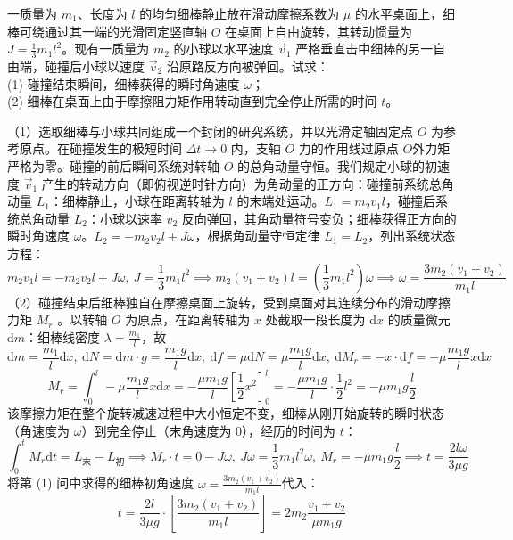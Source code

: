 \begin{example}
一质量为 $m_1$、长度为 $l$ 的均匀细棒静止放在滑动摩擦系数为 $\mu$ 的水平桌面上，细棒可绕通过其一端的光滑固定竖直轴 $O$ 在桌面上自由旋转，其转动惯量为 $J = \frac{1}{3}m_1 l^2$。现有一质量为 $m_2$ 的小球以水平速度 $\vec{v}_1$ 严格垂直击中细棒的另一自由端，碰撞后小球以速度 $\vec{v}_2$ 沿原路反方向被弹回。试求：\\
(1) 碰撞结束瞬间，细棒获得的瞬时角速度 $\omega$；\\
(2) 细棒在桌面上由于摩擦阻力矩作用转动直到完全停止所需的时间 $t$。
\end{example}
\begin{solution}
（1）选取细棒与小球共同组成一个封闭的研究系统，并以光滑定轴固定点 $O$ 为参考原点。在碰撞发生的极短时间 $\Delta t \to 0$ 内，支轴 $O$ 力的作用线过原点 $O$外力矩严格为零。碰撞的前后瞬间系统对转轴 $O$ 的总角动量守恒。我们规定小球的初速度 $\vec{v}_1$ 产生的转动方向（即俯视逆时针方向）为角动量的正方向：碰撞前系统总角动量 $L_1$：细棒静止，小球在距离转轴为 $l$ 的末端处运动。$L_1 = m_2 v_1 l$，碰撞后系统总角动量 $L_2$：小球以速率 $v_2$ 反向弹回，其角动量符号变负；细棒获得正方向的瞬时角速度 $\omega$。$L_2 = -m_2 v_2 l + J\omega$，根据角动量守恒定律 $L_1 = L_2$，列出系统状态方程：$$m_2 v_1 l = -m_2 v_2 l + J\omega ,~J = \frac{1}{3}m_1 l^2\implies m_2 (v_1 + v_2) l = \left( \frac{1}{3}m_1 l^2 \right) \omega\implies\omega = \frac{3m_2 (v_1 + v_2)}{m_1 l}$$
（2）碰撞结束后细棒独自在摩擦桌面上旋转，受到桌面对其连续分布的滑动摩擦力矩 $M_r$ 。以转轴 $O$ 为原点，在距离转轴为 $x$ 处截取一段长度为 $\mathrm{d}x$ 的质量微元 $\mathrm{d}m$：细棒线密度 $\lambda = \frac{m_1}{l}$，故
\[\mathrm{d}m = \frac{m_1}{l}\mathrm{d}x,~\mathrm{d}N = \mathrm{d}m \cdot g = \frac{m_1 g}{l}\mathrm{d}x,~\mathrm{d}f = \mu \mathrm{d}N = \mu \frac{m_1 g}{l}\mathrm{d}x,~\mathrm{d}M_r = -x \cdot \mathrm{d}f = -\mu \frac{m_1 g}{l} x \mathrm{d}x\]
$$M_r = \int_{0}^{l} -\mu \frac{m_1 g}{l} x \mathrm{d}x = -\frac{\mu m_1 g}{l} \left[ \frac{1}{2}x^2 \right]_0^l = -\frac{\mu m_1 g}{l} \cdot \frac{1}{2}l^2 = -\mu m_1 g \frac{l}{2}$$
该摩擦力矩在整个旋转减速过程中大小恒定不变，细棒从刚开始旋转的瞬时状态（角速度为 $\omega$）到完全停止（末角速度为 0），经历的时间为 $t$：
$$\int_{0}^{t} M_r \mathrm{d}t = L_{\text{末}} - L_{\text{初}} \implies M_r \cdot t = 0 - J\omega,~J\omega = \frac{1}{3}m_1 l^2 \omega,~M_r=-\mu m_1 g \frac{l}{2}\implies t = \frac{2l\omega}{3\mu g}$$
将第 (1) 问中求得的细棒初角速度 $\omega = \frac{3m_2 (v_1 + v_2)}{m_1 l}$代入：$$t = \frac{2l}{3\mu g} \cdot \left[ \frac{3m_2 (v_1 + v_2)}{m_1 l} \right] = \boxed{2m_2 \frac{v_1 + v_2}{\mu m_1 g}}$$
\end{solution}



